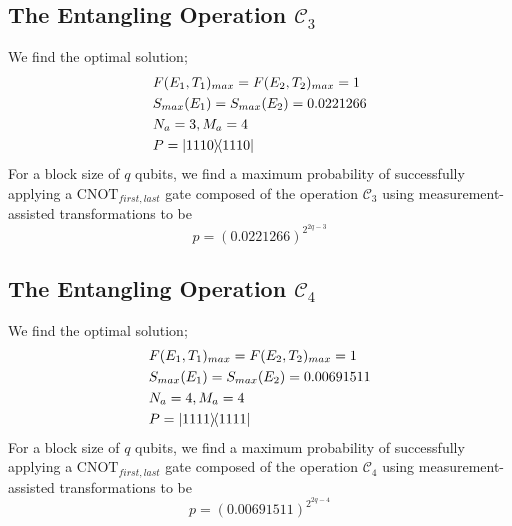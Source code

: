 \documentclass[aps,pra,twocolumn,showpacs,superscriptaddress,floatfix,10pt]{revtex4}
\begin{document}
\subsection{The Entangling Operation $\mathcal{C}_3$}
We find the optimal solution;
\begin{eqnarray}
& F(E_1,T_1)_{max} = F(E_2,T_2)_{max} = 1 \nonumber \\
& S_{max}(E_1) = S_{max}(E_2) = 0.0221266 \\
& N_a = 3,M_a=4 \nonumber \\
& P = \outerproduct{1110}{1110} \nonumber	
\end{eqnarray}
For a block size of $q$ qubits, we find a maximum probability of successfully applying a $\mbox{CNOT}_{first,last}$ gate composed of the operation $\mathcal{C}_3$ using measurement-assisted transformations to be
\begin{equation}
\label{1C4T Result}
p = (0.0221266)^{2^{2q-3}}
\end{equation}
\subsection{The Entangling Operation $\mathcal{C}_4$}
We find the optimal solution;
 \begin{eqnarray}
 & F(E_1,T_1)_{max} = F(E_2,T_2)_{max} = 1 \nonumber\\
 & S_{max}(E_1) = S_{max}(E_2) = 0.00691511 \\
 & N_a = 4,M_a=4 \nonumber\\
 & P = \outerproduct{1111}{1111} \nonumber	
 \end{eqnarray}
For a block size of $q$ qubits, we find a maximum probability of successfully applying a $\mbox{CNOT}_{first,last}$ gate composed of the operation $\mathcal{C}_4$ using measurement-assisted transformations to be
 \begin{equation}
 \label{2C4T Result}
 p = (0.00691511)^{2^{2q-4}}
 \end{equation}
\end{document}

